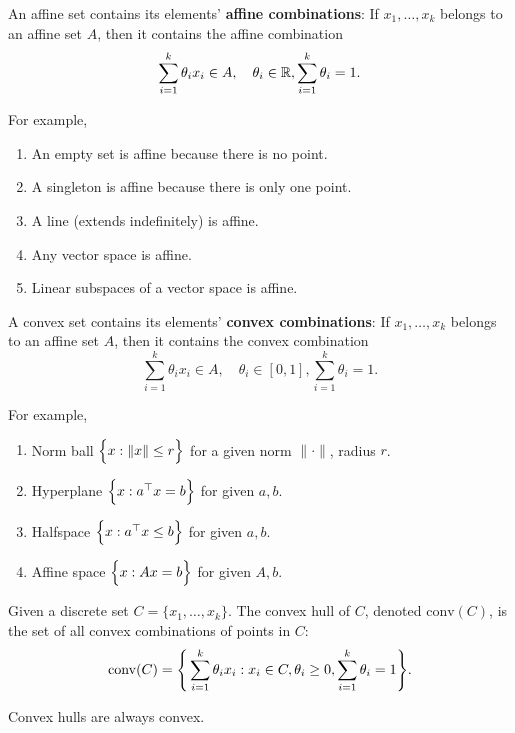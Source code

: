 \begin{definition}
	An affine set contains its elements' \textbf{affine combinations}: If $x_1, \dots, x_k$ belongs to an affine set $A$, then it contains the affine combination
	\begin{equation}
		\sum_{i=1}^k\theta_i x_i\in A, \quad \theta_i\in\mathbb{R}, \sum_{i=1}^k\theta_i = 1.
	\end{equation} 

	\noindent For example,
	\begin{enumerate}
		\item An empty set is affine because there is no point.
		\item A singleton is affine because there is only one point.
		\item A line (extends indefinitely) is affine.
		\item Any vector space is affine.
		\item Linear subspaces of a vector space is affine.	
	\end{enumerate} 
\end{definition} 

\begin{definition}
	A convex set contains its elements' \textbf{convex combinations}: If $x_1, \dots, x_k$ belongs to an affine set $A$, then it contains the convex combination
	\begin{equation}
		\sum_{i=1}^k\theta_i x_i\in A, \quad \theta_i\in [0, 1], \sum_{i=1}^k\theta_i = 1.	
	\end{equation}

	\noindent For example,
	\begin{enumerate}
		\item Norm ball $\Big\{ x:\|x\|\le r \Big\}$ for a given norm $\|\cdot\|$, radius $r$.	
		\item Hyperplane $\Big\{ x:a^\top x = b \Big\}$ for given $a, b$.
		\item Halfspace $\Big\{ x:a^\top x \le b \Big\}$ for given $a, b$.
		\item Affine space $\Big\{ x:Ax = b \Big\}$ for given $A, b$.
	\end{enumerate}  
\end{definition} 

\begin{definition}
	Given a discrete set $C=\{x_1, \dots, x_k\}$. The convex hull of $C$, denoted $\mathrm{conv}(C)$, is the set of all convex combinations of points in $C$:
	\begin{equation}
		\mathrm{conv}(C) = \Bigg\{ 
			\sum_{i=1}^k \theta_ix_i: x_i \in C, \theta_i \ge 0, \sum_{i=1}^k\theta_i = 1 
		 \Bigg\}.
	\end{equation} 	

	\noindent Convex hulls are always convex.
\end{definition} 


